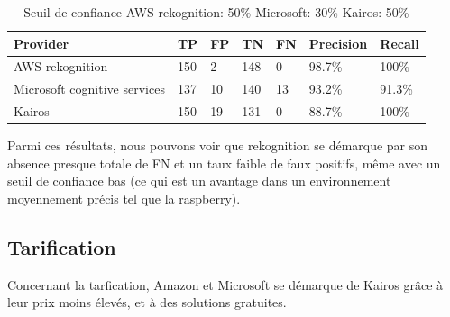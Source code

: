 \begin{table}[H]
\begin{tabular}{|m{2cm} | m{2cm} | m{2cm} | m{2cm} |m{2cm} |m{2cm} |m{2cm}|}
\hline
{\color[HTML]{000000} \textbf{Provider}}              & {\color[HTML]{000000} \textbf{TP}} & {\color[HTML]{000000} \textbf{FP}} & {\color[HTML]{000000} \textbf{TN}} & {\color[HTML]{000000} \textbf{FN}} & {\color[HTML]{000000} \textbf{Precision}} & {\color[HTML]{000000} \textbf{Recall}} \\ \hline
{\color[HTML]{000000} AWS rekognition}                & {\color[HTML]{000000} 150}                    & {\color[HTML]{000000} 2}                       & {\color[HTML]{000000} 148}                    & {\color[HTML]{000000} 0}                       & {\color[HTML]{000000} 98.7\%}                          & {\color[HTML]{000000} 100\%}                        \\ \hline
{\color[HTML]{000000} Microsoft cognitive   services} & {\color[HTML]{000000} 137}                    & {\color[HTML]{000000} 10}                      & {\color[HTML]{000000} 140}                    & {\color[HTML]{000000} 13}                      & {\color[HTML]{000000} 93.2\%}                          & {\color[HTML]{000000} 91.3\%}                       \\ \hline
{\color[HTML]{000000} Kairos}                         & {\color[HTML]{000000} 150}                    & {\color[HTML]{000000} 19}                      & {\color[HTML]{000000} 131}                    & {\color[HTML]{000000} 0}                       & {\color[HTML]{000000} 88.7\%}                          & {\color[HTML]{000000} 100\%}                        \\ \hline
\end{tabular}
\caption{Seuil de confiance AWS rekognition: 50\% Microsoft: 30\% Kairos: 50\%}
\end{table}

Parmi ces résultats, nous pouvons voir que rekognition se démarque par son absence presque totale de FN et un
taux faible de faux positifs, même avec un seuil de confiance bas (ce qui est un avantage dans un environnement
moyennement précis tel que la raspberry).

\subsection{Tarification}

Concernant la tarfication, Amazon et Microsoft se démarque de Kairos grâce à leur prix moins élevés, et à des
solutions gratuites.

